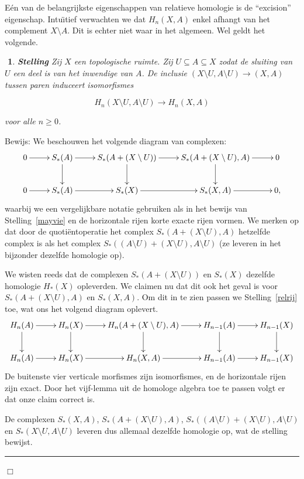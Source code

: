 \documentclass[12pt]{book}
\newcommand{\bew}{{\sc Bewijs: }}
\newcommand{\B}{\rule{1mm}{0mm} \hfill $\Box$ }
\newtheorem{stelh}{$\!\!$}[section]
\newenvironment{stel}{\begin{stelh}{\em {\bf Stelling }}}{\end{stelh}}
\begin{document}
E\'en van de belangrijkste eigenschappen van relatieve homologie is de ``excision'' eigenschap. Intu\"{\i}tief verwachten we dat $H_n(X,A)$ enkel afhangt van het complement $X\setminus A$. Dit is echter niet waar in het algemeen. Wel geldt het volgende.

\begin{stel} Zij $X$ een topologische ruimte. Zij $U\subseteq A\subseteq X$ zodat de sluiting van $U$
een deel is van het inwendige van $A$. De inclusie $(X\setminus U, A\setminus U)\to (X,A)$ tussen
paren induceert isomorfismes

$$H_{n}(X\setminus U, A\setminus U)\to H_{n}(X,A)$$

voor alle $n\geq 0$.
\end{stel}
\bew
We beschouwen het volgende diagram van complexen:
$$
 \xymatrix{ 
0 \ar[r] & S_{*}(A) \ar[r] \ar[d] &  S_{*}(A + (X \setminus U) ) \ar[r] \ar[d] & S_{*}(A + (X \setminus U) ,A) \ar[r] \ar[d] & 0 \\
0  \ar[r] & S_{*}(A) \ar[r]  &  S_{*}( X )  \ar[r]  & S_{*}( X ,A)  \ar[r] & 0,
}
$$
waarbij we een vergelijkbare notatie gebruiken als in het bewijs van Stelling~\ref{mayvie} en de horizontale rijen korte exacte rijen vormen. We merken op dat door de quoti\"entoperatie het complex $S_{*}(A + (X \setminus U) ,A)$ hetzelfde complex is als het complex $S_{*}((A \setminus U) + (X \setminus U) , A \setminus U)$ (ze leveren in het bijzonder dezelfde homologie op).

We wisten reeds dat de complexen $S_{*}(A + (X \setminus U) )$ en $S_{*}( X )$ dezelfde homologie $H_*(X)$ opleverden. We claimen nu dat dit ook het geval is voor $S_{*}(A + (X \setminus U) ,A)$ en $S_{*}( X ,A)$. Om dit in te zien passen we Stelling~\ref{relrij} toe, wat ons het volgend diagram oplevert.
$$
 \xymatrix{ 
H_{n}(A) \ar[r] \ar[d] &  H_{n}(X) \ar[r] \ar[d] &  H_{n}(A+(X\setminus U),A) \ar[r] \ar[d] & H_{n-1}(A) \ar[r] \ar[d] &  H_{n-1}(X) \ar[d]
\\
H_{n}(A) \ar[r] &  H_{n}(X) \ar[r] &  H_{n}(X,A) \ar[r]  & H_{n-1}(A) \ar[r] &  H_{n-1}(X)  
}
$$
De buitenste vier verticale morfismes zijn isomorfismes, en de horizontale rijen zijn exact. Door het vijf-lemma uit de homologe algebra toe te passen volgt er dat onze claim correct is.

De complexen $S_{*}( X ,A)$, $S_{*}(A + (X \setminus U) ,A)$, $S_{*}((A \setminus U) + (X \setminus U) , A \setminus U)$ en $S_{*}( X \setminus U,A \setminus U)$ leveren dus  allemaal dezelfde homologie op, wat de stelling bewijst.
\B
\end{document}
